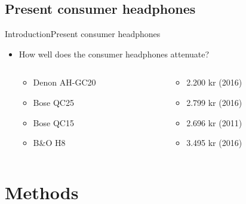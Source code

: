 \subsection{Present consumer headphones}
\begin{frame}{Introduction}{Present consumer headphones}
	\begin{itemize}	
	\item How well does the consumer headphones attenuate?
	\begin{columns}
		\begin{column}{0.27\textwidth}
		\begin{itemize}
			\item Denon AH-GC20
			\item Bose QC25 
			\item Bose QC15 	
			\item B\&O H8 	
		\end{itemize}
		\end{column}
		\begin{column}{0.6\textwidth} 
		\begin{itemize}
			\item[] 2.200 kr (2016)
			\item[] 2.799 kr (2016)
			\item[] 2.696 kr (2011)
			\item[] 3.495 kr (2016)
		\end{itemize}
		\end{column}
	\end{columns}
	\end{itemize}			
	\begin{center}
		
	\end{center}	
\end{frame}





\section{Methods}







